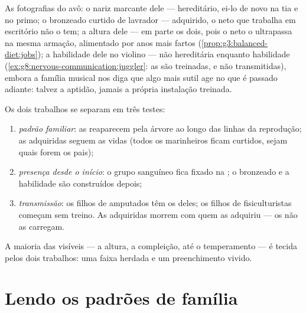 \begin{example}\label{ex:g9:heredity-and-traits:album}
As fotografias do avô: o nariz marcante dele ---
hereditário, ei-lo de novo na tia e no primo; o bronzeado
curtido de lavrador --- adquirido, o neto que trabalha em
escritório não o tem; a altura dele --- em parte os dois,
pois o neto o ultrapassa na mesma armação, alimentado por
anos mais fartos (\cref{prop:g3:balanced-diet:jobs}); a
habilidade dele no violino --- não hereditária enquanto
habilidade (\cref{ex:g8:nervous-communication:juggler}: as
 são treinadas, e não transmitidas), embora a
família musical nos diga que algo mais sutil age no que é
passado adiante: talvez a aptidão, jamais a própria
instalação treinada.
\end{example}

\begin{proposition}\label{prop:g9:heredity-and-traits:sorting}
Os dois trabalhos se separam em três testes:
\begin{enumerate}
  \item \emph{padrão familiar}: as  reaparecem pela árvore ao longo das
        linhas da reprodução; as adquiridas seguem as vidas
        (todos os marinheiros ficam curtidos, sejam quais
        forem os pais);
  \item \emph{presença desde o início}: o grupo sanguíneo
        fica fixado na ; o bronzeado e a
        habilidade são construídos depois;
  \item \emph{transmissão}: os filhos de amputados têm os
         deles; os filhos de fisiculturistas começam
        sem treino. As  adquiridas morrem
        com quem as adquiriu --- os  não as carregam.
\end{enumerate}
A maioria das  visíveis --- a altura, a
compleição, até o temperamento --- é tecida pelos dois
trabalhos: uma faixa herdada e um preenchimento vivido.
\end{proposition}
\admitted

\section{Lendo os padrões de família}

